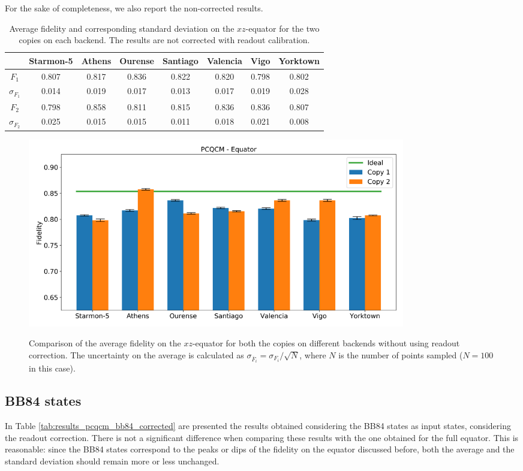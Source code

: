 For the sake of completeness, we also report the non-corrected results.
\begin{table}[H]
  \centering
  \begin{tabular}{|c|c|c|c|c|c|c|c|}
  \hline
  \textbf{} & \textbf{Starmon-5} & \textbf{Athens} & \textbf{Ourense} & \textbf{Santiago} & \textbf{Valencia} & \textbf{Vigo} & \textbf{Yorktown} \\ \hline
  $F_1$              & 0.807 & 0.817 & 0.836 & 0.822 & 0.820 & 0.798 & 0.802 \\ \hline
  $\sigma_{F_1}$     & 0.014 & 0.019 & 0.017 & 0.013 & 0.017 & 0.019 & 0.028 \\ \hline
  $F_2$              & 0.798 & 0.858 & 0.811 & 0.815 & 0.836 & 0.836 & 0.807 \\ \hline
  $\sigma_{F_2}$     & 0.025 & 0.015 & 0.015 & 0.011 & 0.018 & 0.021 & 0.008 \\ \hline
  \end{tabular}
  \caption{Average fidelity and corresponding standard deviation on the $xz$-equator for the two copies on each backend. The results are not corrected with readout calibration.}
  \label{tab:results_pcqcm_onlyequator_not_corrected}
\end{table}
\begin{figure}[H]
  \centering
          \includegraphics[width=0.8\textwidth]{Figures/PhaseCovariant/Histograms/histo_equator.png}
      \label{fig:pc_histo_equator_not_corrected}
      \caption{Comparison of the average fidelity on the $xz$-equator for both the copies on different backends without using readout correction. The uncertainty on the average is calculated as $\sigma_{\overline{F}_i}=\sigma_{F_i}/\sqrt{N}$, where $N$ is the number of points sampled ($N=100$ in this case).}
\end{figure}

\subsection{BB84 states}
In Table \ref{tab:results_pcqcm_bb84_corrected} are presented the results obtained considering the BB84 states as input states, considering the readout correction.
There is not a significant difference when comparing these results with the one obtained for the full equator.
This is reasonable: since the BB84 states correspond to the peaks or dips of the fidelity on the equator discussed before, 
both the average and the standard deviation should remain more or less unchanged.

